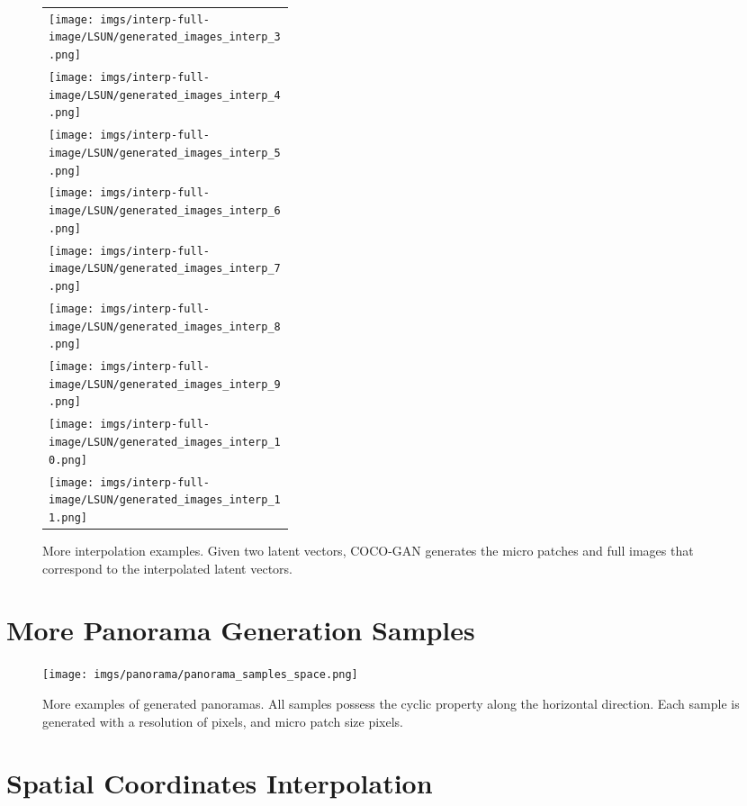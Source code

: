 \documentclass{article}
\newcommand{\modelName}{COCO-GAN }
\begin{document}
\begin{appendices}
\begin{figure}[H]
{\begin{tabular}{C{0.35\linewidth}}
            \texttt{[image: imgs/interp-full-image/LSUN/generated\_images\_interp\_3.png]} \\
            \texttt{[image: imgs/interp-full-image/LSUN/generated\_images\_interp\_4.png]} \\
            \texttt{[image: imgs/interp-full-image/LSUN/generated\_images\_interp\_5.png]} \\
            \texttt{[image: imgs/interp-full-image/LSUN/generated\_images\_interp\_6.png]} \\
            \texttt{[image: imgs/interp-full-image/LSUN/generated\_images\_interp\_7.png]} \\
            \texttt{[image: imgs/interp-full-image/LSUN/generated\_images\_interp\_8.png]} \\
            \texttt{[image: imgs/interp-full-image/LSUN/generated\_images\_interp\_9.png]} \\
            \texttt{[image: imgs/interp-full-image/LSUN/generated\_images\_interp\_10.png]} \\
            \texttt{[image: imgs/interp-full-image/LSUN/generated\_images\_interp\_11.png]} \\
        \end{tabular}}
        
        \caption{More interpolation examples. Given two latent vectors, \modelName generates the micro patches and full images that correspond to the interpolated latent vectors.}
    \end{figure}
    


\section{More Panorama Generation Samples}
    \label{appendix:panorama-samples}
    \begin{figure}[H]
        \texttt{[image: imgs/panorama/panorama\_samples\_space.png]}
        \caption{More examples of generated panoramas. All samples possess the cyclic property along the horizontal direction. Each sample is generated with a resolution of  pixels, and micro patch size  pixels.}
    \end{figure}
    
    \vspace{1em}
    
\section{Spatial Coordinates Interpolation}


\end{appendices}
\end{document}
